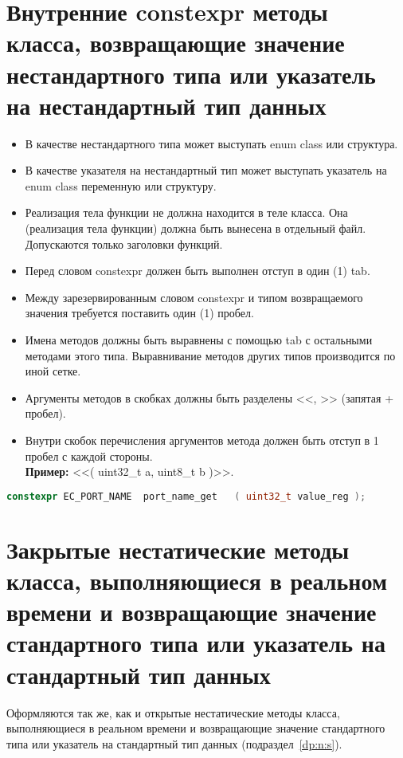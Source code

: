 \section{Внутренние constexpr методы класса, возвращающие значение не\-стан\-дарт\-но\-го типа или указатель на не\-стан\-дарт\-ный тип данных}\label{zp:constexpr:n}
\begin{itemize}
	\item В качестве нестандартного типа может выступать enum class или структура.
	\item В качестве указателя на нестандартный тип может выступать указатель на enum class переменную или структуру.
	\item Реализация тела функции не должна находится в теле класса. Она (реализация тела функции) должна быть вынесена в отдельный файл. Допускаются только заголовки функций.
	\item Перед словом constexpr должен быть выполнен отступ в один (1) tab.
	\item Между зарезервированным словом constexpr и типом возвращаемого значения требуется поставить один (1) пробел.
	\item Имена методов должны быть выравнены с помощью tab с остальными методами этого типа. Выравнивание методов других типов производится по иной сетке.
	\item Аргументы методов в скобках должны быть разделены <<, >> (запятая + пробел).
	\item Внутри скобок перечисления аргументов метода должен быть отступ в 1 пробел с каждой стороны.\\\textbf{Пример: } <<( uint32\_t a, uint8\_t b )>>.
\end{itemize}\begin{lstlisting}[language=C++, frame=tlBR, basicstyle=\fontsize{10}{10}\ttfamily]
	constexpr EC_PORT_NAME	port_name_get	( uint32_t value_reg );
\end{lstlisting}

\section{Закрытые нестатические методы класса, выполняющиеся в реальном времени и возвращающие значение стандартного типа или указатель на стандартный тип данных}\label{zp:n:s}
Оформляются так же, как и открытые нестатические методы класса, выполняющиеся в реальном времени и возвращающие значение стандартного типа или указатель на стандартный тип данных (подраздел~\ref{dp:n:s}).


